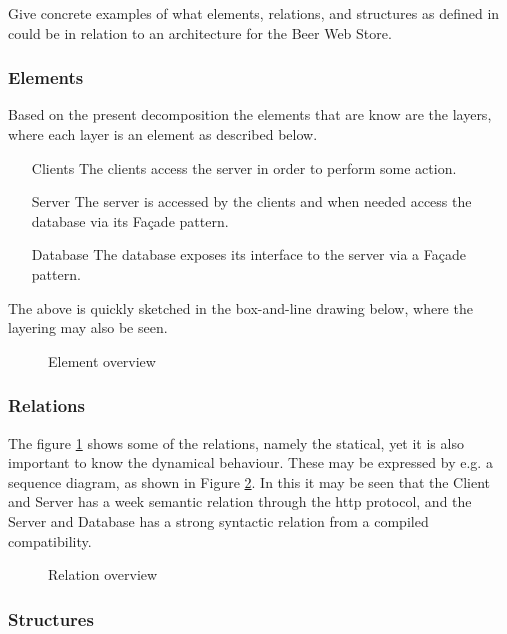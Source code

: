 \begin{question}
Give concrete examples of what elements, relations, and structures as defined in \cite{bass2003sa} could be in relation to an architecture for the Beer Web Store.
\end{question}

\subsubsection{Elements}
Based on the present decomposition the elements that are know are the layers, where each layer is an element as described below.
\begin{itemize}
    \item[Clients] The clients access the server in order to perform some action.
    \item[Server] The server is accessed by the clients and when needed access the database via its Fa\c cade pattern.
    \item[Database] The database exposes its interface to the server via a Fa\c cade pattern.
\end{itemize}
The above is quickly sketched in the box-and-line drawing below, where the layering may also be seen. 
\begin{figure}[!htb]
\centerline{}
\caption{Element overview}
\label{fig:module_view}
\end{figure}
\clearpage

\subsubsection{Relations}
The figure \ref{fig:module_view} shows some of the relations, namely the statical, yet it is also important to know the dynamical behaviour. These may be expressed by e.g. a sequence diagram, as shown in Figure \ref{fig:sequence}. In this it may be seen that the Client and Server has a week semantic relation through the http protocol, and the Server and Database has a strong syntactic relation from a compiled compatibility. 

\begin{figure}[!htb]
\centerline{}
\caption{Relation overview}
\label{fig:sequence}
\end{figure}

\subsubsection{Structures}

